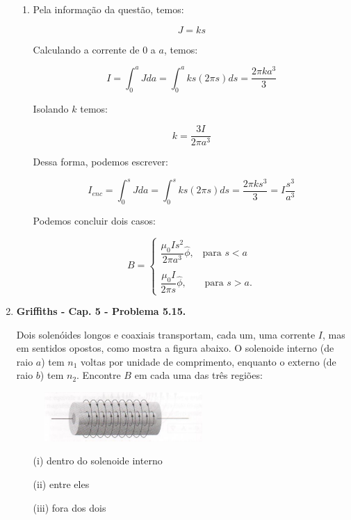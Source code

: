 \documentclass[11pt,a4paper]{article}
\begin{document}
\begin{enumerate}
\begin{enumerate}
\item

Pela informação da questão, temos:

$$J = ks$$

Calculando a corrente de $0$ a $a$, temos:

$$I = \displaystyle\int_0^{a} J da = \displaystyle\int_0^{a} ks(2\pi s)ds = \displaystyle\dfrac{2\pi ka^3}{3}$$

Isolando $k$ temos:

$$ k = \displaystyle\dfrac{3I}{2\pi a^3} $$

Dessa forma, podemos escrever:

$$I_{enc} = \displaystyle\int_0^{s} J da = \displaystyle\int_0^{s} ks (2\pi s) ds = \displaystyle\dfrac{2\pi ks^3}{3} = I\displaystyle\dfrac{s^3}{a^3}$$

Podemos concluir dois casos:

$$B = 
		\begin{cases}
			\displaystyle\dfrac{\mu_0 I s^2}{2\pi a^3}\hat{\phi}\textrm{,} \quad \textrm{para } s < a \\
			\\
			\displaystyle\dfrac{\mu_0 I}{2\pi s}\hat{\phi}\textrm{,} \quad \quad \textrm{para } s > a.
		\end{cases}
$$

\end{enumerate}


\item \textbf{Griffiths - Cap. 5 - Problema 5.15.}


Dois solenóides longos e coaxiais transportam, cada um, uma corrente $I$, mas em sentidos opostos, como mostra a figura abaixo. O solenoide interno (de raio $a$) tem $n_1$ voltas por unidade de comprimento, enquanto o externo (de raio $b$) tem $n_2$. Encontre $B$ em cada uma das três regiões:

\begin{figure}[h]	
\centering %
\includegraphics[width=6cm]{Selection_096.jpg} 
\end{figure}

\begin{enumerate}
\item[(i)] dentro do solenoide interno
\item[(ii)] entre eles
\item[(iii)] fora dos dois
\end{enumerate}



\end{enumerate}
\end{document}
